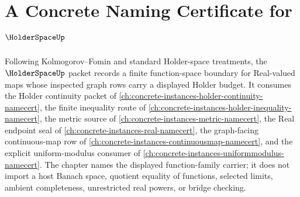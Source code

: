 \chapter{A Concrete Naming Certificate for $\HolderSpaceUp$}
\label{ch:concrete-instances-holder-space-namecert}

Following Kolmogorov--Fomin and standard Holder-space treatments, the $\HolderSpaceUp$ packet records a finite function-space boundary for Real-valued maps whose inspected graph rows carry a displayed Holder budget. It consumes the Holder continuity packet of \autoref{ch:concrete-instances-holder-continuity-namecert}, the finite inequality route of \autoref{ch:concrete-instances-holder-inequality-namecert}, the metric source of \autoref{ch:concrete-instances-metric-namecert}, the Real endpoint seal of \autoref{ch:concrete-instances-real-namecert}, the graph-facing continuous-map row of \autoref{ch:concrete-instances-continuousmap-namecert}, and the explicit uniform-modulus consumer of \autoref{ch:concrete-instances-uniformmodulus-namecert}. The chapter names the displayed function-family carrier; it does not import a host Banach space, quotient equality of functions, selected limits, ambient completeness, unrestricted real powers, or bridge checking.

